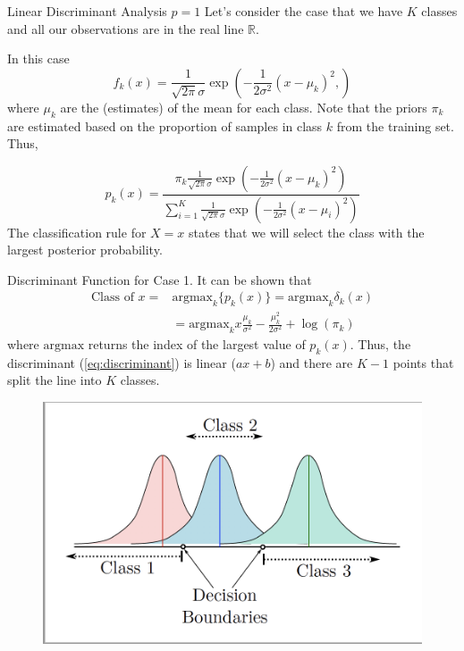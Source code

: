 \documentclass{beamer}
\begin{document}
\begin{frame}{Linear Discriminant Analysis $p=1$}
	Let's consider the case that we have $K$ classes and all our observations are in the real line $\mathbb{R}$.
	
	
	In this case
	\begin{equation*}
		f_k(x)= \frac{1}{\sqrt{2\pi}\sigma} \exp\left( 
		-\frac{1}{2\sigma^2} (x-\mu_k)^2,
		\right)
	\end{equation*}
	where $\mu_k$ are the (estimates) of the mean for each class. Note that the priors $\pi_k$ are estimated based on the proportion of samples in class $k$ from the training set. Thus,
	
	\begin{equation*}
		p_k(x) = \frac{\pi_k \frac{1}{\sqrt{2\pi}\sigma} \exp\left( 
			-\frac{1}{2\sigma^2} (x-\mu_k)^2
			\right)}{\sum_{i=1}^K \frac{1}{\sqrt{2\pi}\sigma} \exp\left( 
			-\frac{1}{2\sigma^2} (x-\mu_i)^2
			\right)}
	\end{equation*}
	The classification rule for $X=x$ states that we will select the class with the largest posterior probability.
	
	
\end{frame}

\begin{frame}{Discriminant Function for Case 1.}
	It can be shown that 
	\begin{equation}
		\begin{split}
			\textrm{Class of }x=& \textrm{argmax}_k \{p_k(x) \}= \textrm{argmax}_k \delta_k(x)\\
			&=\textrm{argmax}_k x \frac{\mu_k}{\sigma^2}- \frac{\mu_k^2}{2\sigma^2} + \log(\pi_k)
		\end{split}
	\label{eq:discriminant}
		\end{equation}
	where $\mathrm{argmax}$ returns the index of the largest value of $p_k(x)$.
 Thus, the discriminant  (\ref{eq:discriminant}) is linear ($ax+b$) and there are $K-1$ points that split the line into $K$ classes.
 
  \begin{figure}[h]
 	\centering
 	\includegraphics[scale=0.35]{../../Figures/fig_lda.png}
 \end{figure}
\end{frame}
\end{document}
